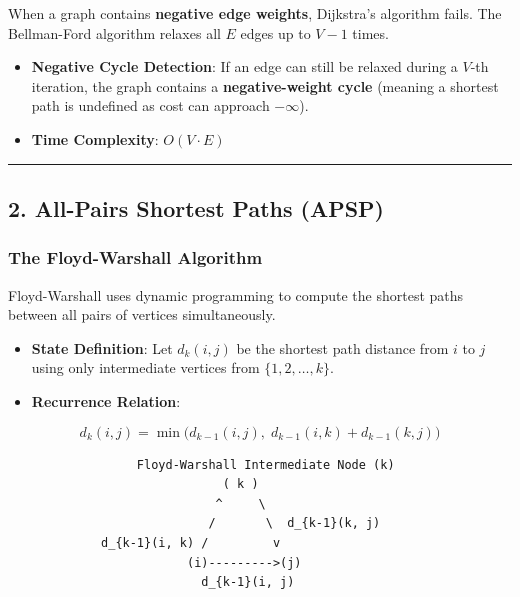 \documentclass[
]{book}
\providecommand{\tightlist}{%
  \setlength{\itemsep}{0pt}\setlength{\parskip}{0pt}}
\theoremstyle{definition}
\theoremstyle{definition}
\theoremstyle{definition}
\theoremstyle{definition}
\theoremstyle{remark}
\begin{document}
When a graph contains \textbf{negative edge weights}, Dijkstra's algorithm fails. The Bellman-Ford algorithm relaxes all \(E\) edges up to \(V - 1\) times.

\begin{itemize}
\tightlist
\item
  \textbf{Negative Cycle Detection}: If an edge can still be relaxed during a \(V\)-th iteration, the graph contains a \textbf{negative-weight cycle} (meaning a shortest path is undefined as cost can approach \(-\infty\)).
\item
  \textbf{Time Complexity}: \(O(V \cdot E)\)
\end{itemize}

\begin{center}\rule{0.5\linewidth}{0.5pt}\end{center}

\subsection{2. All-Pairs Shortest Paths (APSP)}\label{all-pairs-shortest-paths-apsp}

\subsubsection{The Floyd-Warshall Algorithm}\label{the-floyd-warshall-algorithm}

Floyd-Warshall uses dynamic programming to compute the shortest paths between all pairs of vertices simultaneously.

\begin{itemize}
\tightlist
\item
  \textbf{State Definition}: Let \(d_k(i, j)\) be the shortest path distance from \(i\) to \(j\) using only intermediate vertices from \(\{1, 2, \dots, k\}\).
\item
  \textbf{Recurrence Relation}:
\end{itemize}

\[d_k(i, j) = \min \Big( d_{k-1}(i, j), \; d_{k-1}(i, k) + d_{k-1}(k, j) \Big)\]

\begin{verbatim}
                  Floyd-Warshall Intermediate Node (k)
                              ( k )
                             ^     \
                            /       \  d_{k-1}(k, j)
             d_{k-1}(i, k) /         v
                         (i)--------->(j)
                           d_{k-1}(i, j)
\end{verbatim}
\end{document}
